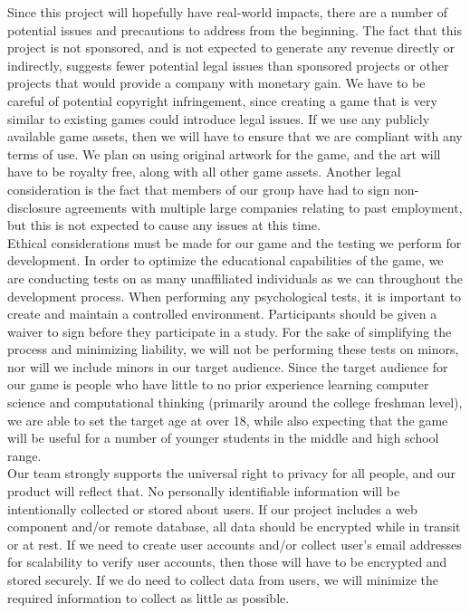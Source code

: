 Since this project will hopefully have real-world impacts, there are a number of
potential issues and precautions to address from the beginning. The fact that
this project is not sponsored, and is not expected to generate any revenue
directly or indirectly, suggests fewer potential legal issues than sponsored
projects or other projects that would provide a company with monetary gain. We have to
be careful of potential copyright infringement, since creating a game that is
very similar to existing games could introduce legal issues. If we use any
publicly available game assets, then we will have to ensure that we are
compliant with any terms of use. We plan on using original artwork for the game,
and the art will have to be royalty free, along with all other game assets.
Another legal consideration is the fact that members of our group have had to
sign non-disclosure agreements with multiple large companies relating to past
employment, but this is not expected to cause any issues at this time.\\

Ethical considerations must be made for our game and the testing we perform for
development. In order to optimize the educational capabilities of the game, we
are conducting tests on as many unaffiliated individuals as we can throughout
the development process. When performing any psychological tests, it is
important to create and maintain a controlled environment. Participants should be given a
waiver to sign before they participate in a study. For the sake of simplifying
the process and minimizing liability, we will not be performing these tests on
minors, nor will we include minors in our target audience. Since the target
audience for our game is people who have little to no prior experience learning computer
science and computational thinking (primarily around the college freshman
level), we are able to set the target age at over 18, while also expecting that
the game will be useful for a number of younger students in the middle and high
school range.\\

Our team strongly supports the universal right to privacy for all people, and
our product will reflect that. No personally identifiable information will be
intentionally collected or stored about users. If our project includes a web
component and/or remote database, all data should be encrypted while in transit
or at rest. If we need to create user accounts and/or collect user’s email
addresses for scalability to verify user accounts, then those will have to be
encrypted and stored securely.
If we do need to collect data from users, we will minimize the required information
to collect as little as possible.

